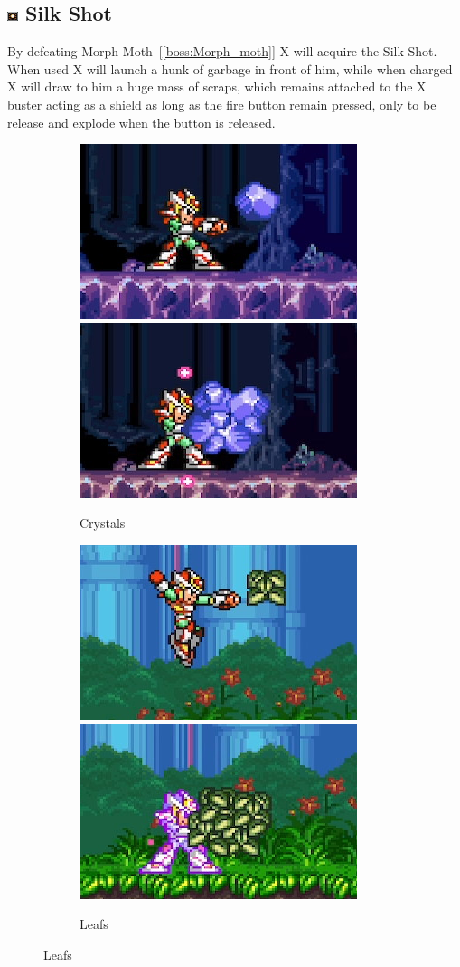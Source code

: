 \subsection{\includegraphics[width=12px, height=10px]{figures/X2/weapons/S_shot.png} Silk Shot}\label{Silk_shot}
By defeating Morph Moth~[\ref{boss:Morph_moth}] X will acquire the Silk Shot. When used X will launch a hunk of garbage in front of him, while when charged X will draw to him a huge mass of scraps, which remains attached to the X buster acting as a shield as long as the fire button remain pressed, only to be release and explode when the button is released.
\begin{figure}[htp]
	\begin{subfigure}{\linewidth}
		\centering
		\includegraphics[width=0.4\linewidth]{figures/X2/weapons/S_shot_1.png}	
		\includegraphics[width=0.4\linewidth]{figures/X2/weapons/S_shot_2.png}	
		\caption{Crystals}	
	\end{subfigure}
	\begin{subfigure}{\linewidth}
		\centering
		\includegraphics[width=0.4\linewidth]{figures/X2/weapons/S_shot_3.png}	
		\includegraphics[width=0.4\linewidth]{figures/X2/weapons/S_shot_4.png}	
		\caption{Leafs}
	\end{subfigure}
\end{figure}
